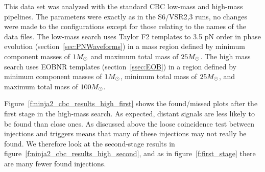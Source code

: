 This data set was analyzed with the standard CBC low-mass and
high-mass pipelines.  The parameters were exactly as in the S6/VSR2,3
runs, no changes were made to the configurations except for those
relating to the names of the data files.  The low-mass search uses
Taylor F2 templates to 3.5 pN order in phase evolution
(section~\ref{sec:PNWaveforms}) in a mass region defined by minimum
component masses of $1 M_\odot$ and maximum total mass of $25 M_\odot$.
The high mass search uses EOBNR templates (section~\ref{ssec:EOB}) in
a region defined by minimum component masses of $1 M_\odot$, minimum
total mass of $25 M_\odot$, and maximum total mass of $100 M_\odot$.


Figure~\ref{f:ninja2_cbc_results_high_first} shows the found/missed plots
after the first stage in the high-mass search.  As expected, distant
signals are less likely to be found than close ones.  As discussed
above the loose coincidence test between injections and triggers means
that many of these injections may not really be found.  We therefore
look at the second-stage results in
figure~\ref{f:ninja2_cbc_results_high_second}, and as in
figure~\ref{f:first_stage} there are many fewer found injections.  


